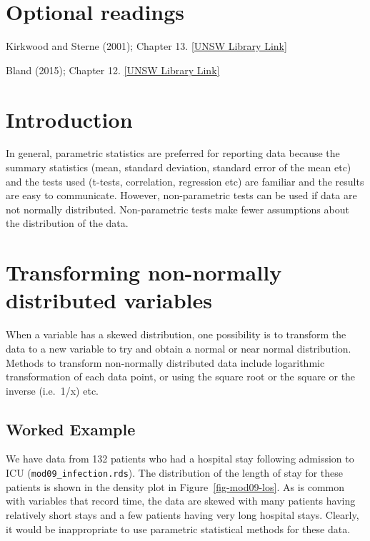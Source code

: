 \documentclass[
  a4paper,
]{memoir}
\begin{document}
\section*{Optional readings}\label{optional-readings-8}


Kirkwood and Sterne (2001); Chapter 13.
\href{http://er1.library.unsw.edu.au/er/cgi-bin/eraccess.cgi?url=https://ebookcentral.proquest.com/lib/unsw/detail.action?docID=624728}{{[}UNSW
Library Link{]}}

Bland (2015); Chapter 12.
\href{http://er1.library.unsw.edu.au/er/cgi-bin/eraccess.cgi?url=https://ebookcentral.proquest.com/lib/unsw/detail.action?docID=5891730}{{[}UNSW
Library Link{]}}

\section{Introduction}\label{introduction-8}

In general, parametric statistics are preferred for reporting data
because the summary statistics (mean, standard deviation, standard error
of the mean etc) and the tests used (t-tests, correlation, regression
etc) are familiar and the results are easy to communicate. However,
non-parametric tests can be used if data are not normally distributed.
Non-parametric tests make fewer assumptions about the distribution of
the data.

\section{Transforming non-normally distributed
variables}\label{transforming-non-normally-distributed-variables}

When a variable has a skewed distribution, one possibility is to
transform the data to a new variable to try and obtain a normal or near
normal distribution. Methods to transform non-normally distributed data
include logarithmic transformation of each data point, or using the
square root or the square or the inverse (i.e.~1/x) etc.

\subsection{Worked Example}\label{worked-example-6}

We have data from 132 patients who had a hospital stay following
admission to ICU (\texttt{mod09\_infection.rds}). The distribution of
the length of stay for these patients is shown in the density plot in
Figure~\ref{fig-mod09-los}. As is common with variables that record
time, the data are skewed with many patients having relatively short
stays and a few patients having very long hospital stays. Clearly, it
would be inappropriate to use parametric statistical methods for these
data.
\end{document}

